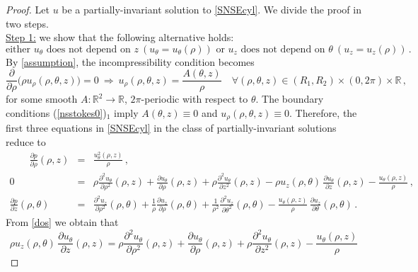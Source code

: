 \documentclass[10pt,a4paper]{amsart}
\newcommand{\R}{\mathbb{R}}
\def\eq#1{(\ref{#1})}
\begin{document}
	\begin{proof} Let $u$ be a partially-invariant solution to \eqref{SNSEcyl}. We divide the proof in two steps. \\
		\underline{Step 1:} we show that the following alternative holds:
		\begin{equation}\label{either}
			\mbox{either }u_\theta\mbox{ does not depend on }z\ (u_\theta=u_\theta(\rho))
			\mbox{ or }u_z\mbox{ does not depend on }\theta\ (u_z=u_z(\rho))\, .
		\end{equation}By \eqref{assumption}, the incompressibility condition becomes
		\begin{equation}\label{incom-cylin}
			\frac{\partial}{\partial\rho}\Big(\rho u_\rho(\rho,\theta,z)\Big)=0 \ \Longrightarrow \ u_{\rho}(\rho,\theta,z)
			=\frac{A(\theta,z)}{\rho} \quad  \forall (\rho,\theta,z)\in(R_1,R_2)\times (0, 2\pi)\times \mathbb{R}\, ,
		\end{equation}
		for some smooth $A:\R^2\to\mathbb{R}$, $2\pi$-periodic with respect to $\theta$. The boundary conditions \eq{nsstokes0}$_1$ imply $A(\theta,z)\equiv0$ and $u_{\rho}(\rho, \theta, z)\equiv0$.
		Therefore, the first three equations in \eqref{SNSEcyl} in the class of partially-invariant solutions reduce to
		\begin{eqnarray}
			\qquad \frac{\partial p}{\partial \rho}(\rho, z) &=& \frac{u^{2}_{\theta}(\rho,z)}{\rho}\, ,\label{uno}\\
			0 \quad &=& \rho\frac{\partial^2 u_{\theta}}{\partial\rho^2}(\rho,z) +
			\frac{\partial u_{\theta}}{\partial\rho}(\rho,z)+\rho\frac{\partial^2 u_{\theta}}{\partial z^2}(\rho,z)
			-\rho u_z(\rho,\theta)\, \frac{\partial u_{\theta}}{\partial z}(\rho,z)- \frac{u_\theta(\rho,z)}{\rho}\, ,\label{dos}\\
			\frac{\partial p}{\partial z}(\rho, \theta) &=& \frac{\partial^2 u_z}{\partial\rho^2}(\rho,\theta) +\frac{1}{\rho}\frac{\partial u_z}{\partial\rho}(\rho,\theta)+\frac{1}{\rho^2}\frac{\partial^2 u_z}{\partial\theta^2}(\rho,\theta)-
			\frac{u_\theta(\rho,z)}{\rho}\, \frac{\partial u_z}{\partial\theta}(\rho,\theta)\, .\label{tres}
		\end{eqnarray}
		From \eqref{dos} we obtain that
		\begin{equation}\label{sinB}
			\rho u_z(\rho,\theta)\, \frac{\partial u_{\theta}}{\partial z}(\rho,z)=\rho\frac{\partial^2 u_{\theta}}{\partial\rho^2}(\rho,z) +
			\frac{\partial u_{\theta}}{\partial\rho}(\rho,z)+\rho\frac{\partial^2u_{\theta}}{\partial z^2}(\rho,z)-\frac{u_\theta(\rho,z)}{\rho}
		\end{equation}

\end{proof}
\end{document}
